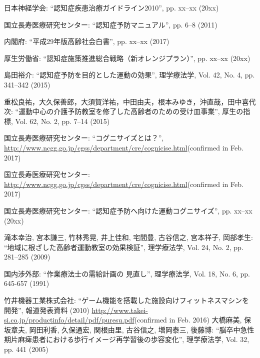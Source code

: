 \thispagestyle{myheadings}
\markright{}
\def\bibname{参考文献}
\begin{thebibliography}{20}


日本神経学会: ``認知症疾患治療ガイドライン2010'', pp. xx--xx (20xx)

国立長寿医療研究センター: ``認知症予防マニュアル'', pp. 6--8 (2011)

内閣府: ``平成29年版高齢社会白書'', pp. xx--xx (2017)

厚生労働省: ``認知症施策推進総合戦略（新オレンジプラン）'', pp. xx--xx (20xx)

島田裕介: ``認知症予防を目的とした運動の効果'', 理学療法学, Vol. 42, No. 4, pp. 341--342 (2015)

重松良祐，大久保善郎，大須賀洋祐，中田由夫，根本みゆき，沖直哉，田中喜代次: ``運動中心の介護予防教室を修了した高齢者のための受け皿事業'', 厚生の指標, Vol. 62, No. 2, pp. 7--14 (2015)

国立長寿医療研究センター: ``コグニサイズとは？'', \url{http://www.ncgg.go.jp/cgss/department/cre/cognicise.html}(confirmed in Feb. 2017)

国立長寿医療研究センター: \url{http://www.ncgg.go.jp/cgss/department/cre/cognicise.html}(confirmed in Feb. 2017)

国立長寿医療研究センター: ``認知症予防へ向けた運動コグニサイズ'', pp. xx--xx (20xx)

滝本幸治, 宮本謙三, 竹林秀晃, 井上佳和, 宅間豊, 古谷信之, 宮本祥子, 岡部孝生: ``地域に根ざした高齢者運動教室の効果検証'', 理学療法学, Vol. 24, No. 2, pp. 281--285 (2009)

国内渉外部: ``作業療法士の需給計画の 見直し'', 理学療法学, Vol. 18, No. 6, pp. 645-657 (1991)

竹井機器工業株式会社: ``ゲーム機能を搭載した施設向けフィットネスマシンを開発'', 報道発表資料 (2010)
\url{http://www.takei-si.co.jp/productinfo/detail/pdf/puresu.pdf}(confirmed in Feb. 2016)
大橋麻美, 保坂章夫, 岡田利香, 久保通宏, 関根由里, 古谷信之, 増岡泰三, 後藤博: ``脳卒中急性期片麻痺患者における歩行イメージ再学習後の歩容変化'', 理学療法学, Vol. 32,  pp. 441 (2005)


\end{thebibliography}
